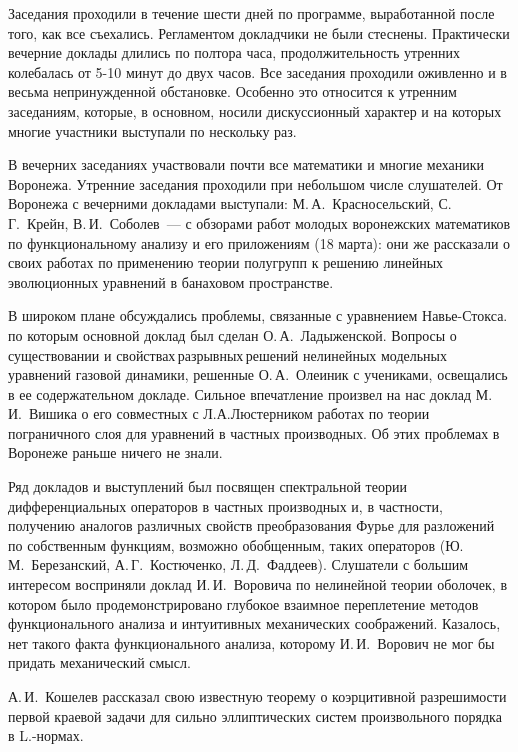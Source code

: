 Заседания проходили в течение шести дней по программе, выработанной после того, как все съехались.
Регламентом докладчики не были стеснены.
Практически вечерние доклады длились по полтора часа,
продолжительность
\linebreak
утренних колебалась от 5-10 минут до двух часов.
Все заседания проходили оживленно и в весьма непринужденной обстановке. Особенно это относится к утренним заседаниям, которые, в основном, носили дискуссионный характер и на которых многие участники выступали по нескольку раз.

В вечерних заседаниях участвовали почти все математики и многие механики Воронежа.
Утренние заседания проходили при небольшом числе слушателей.
От Воронежа с вечерними докладами выступали:
М.\,А.~Красносельский,
\linebreak
С.\,Г.~Крейн, В.\,И.~Соболев~--- с обзорами работ молодых воронежских математиков по функциональному анализу и его приложениям (18 марта): они же рассказали о своих работах по применению теории полугрупп к решению линейных эволюционных уравнений в банаховом пространстве.

В широком плане обсуждались проблемы, связанные с уравнением Навье-Стокса. по которым основной доклад был сделан О.\,А.~Ладыженской. Вопросы о существовании и \linebreak свойствах\,разрывных\,решений нелинейных модельных уравнений газовой динамики, решенные О.\,А.~Олеиник с учениками, освещались в ее содержательном докладе. Сильное впечатление произвел на нас доклад М.\,И.~Вишика о его совместных с Л.А.Люстерником работах по теории пограничного слоя для уравнений в частных производных. Об этих проблемах в Воронеже раньше ничего не знали.

Ряд докладов и выступлений был посвящен спектральной теории дифференциальных операторов в частных производных и,
в частности, получению аналогов различных свойств преобразования Фурье для разложений по собственным функциям,
возможно обобщенным, таких операторов
(Ю.\,М.~Березанский, А.\,Г.~Костюченко, Л.\,Д.~Фаддеев).
Слушатели с большим интересом восприняли доклад И.\,И.~Воровича по нелинейной теории оболочек,
в котором было продемонстрировано глубокое взаимное переплетение методов функционального анализа и интуитивных механических соображений. Казалось, нет такого факта функционального анализа, которому И.\,И.~Ворович не мог бы придать механический смысл.

А.\,И.~Кошелев рассказал свою известную теорему о коэрцитивной разрешимости первой краевой задачи для сильно эллиптических систем произвольного порядка в L.-нормах.

